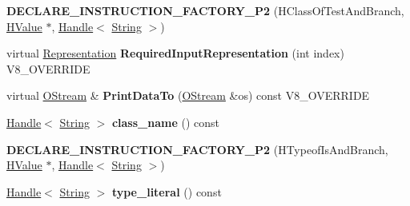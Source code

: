 \begin{DoxyCompactItemize}
\item 
\hypertarget{classv8_1_1internal_1_1_v8___f_i_n_a_l_a90813e22afb8a3de733c7b9fedb4fa93}{}{\bfseries D\+E\+C\+L\+A\+R\+E\+\_\+\+I\+N\+S\+T\+R\+U\+C\+T\+I\+O\+N\+\_\+\+F\+A\+C\+T\+O\+R\+Y\+\_\+\+P2} (H\+Class\+Of\+Test\+And\+Branch, \hyperlink{classv8_1_1internal_1_1_h_value}{H\+Value} $\ast$, \hyperlink{classv8_1_1internal_1_1_handle}{Handle}$<$ \hyperlink{classv8_1_1internal_1_1_string}{String} $>$)\label{classv8_1_1internal_1_1_v8___f_i_n_a_l_a90813e22afb8a3de733c7b9fedb4fa93}

\item 
\hypertarget{classv8_1_1internal_1_1_v8___f_i_n_a_l_a6c6d1f37f40b113d8f4062f1ffff7215}{}virtual \hyperlink{classv8_1_1internal_1_1_representation}{Representation} {\bfseries Required\+Input\+Representation} (int index) V8\+\_\+\+O\+V\+E\+R\+R\+I\+D\+E\label{classv8_1_1internal_1_1_v8___f_i_n_a_l_a6c6d1f37f40b113d8f4062f1ffff7215}

\item 
\hypertarget{classv8_1_1internal_1_1_v8___f_i_n_a_l_ac450dad970b14246be761ccf5004924b}{}virtual \hyperlink{classv8_1_1internal_1_1_o_stream}{O\+Stream} \& {\bfseries Print\+Data\+To} (\hyperlink{classv8_1_1internal_1_1_o_stream}{O\+Stream} \&os) const V8\+\_\+\+O\+V\+E\+R\+R\+I\+D\+E\label{classv8_1_1internal_1_1_v8___f_i_n_a_l_ac450dad970b14246be761ccf5004924b}

\item 
\hypertarget{classv8_1_1internal_1_1_v8___f_i_n_a_l_a7b18ffc26a6e41abdb1d829e56fcd61e}{}\hyperlink{classv8_1_1internal_1_1_handle}{Handle}$<$ \hyperlink{classv8_1_1internal_1_1_string}{String} $>$ {\bfseries class\+\_\+name} () const \label{classv8_1_1internal_1_1_v8___f_i_n_a_l_a7b18ffc26a6e41abdb1d829e56fcd61e}

\item 
\hypertarget{classv8_1_1internal_1_1_v8___f_i_n_a_l_a01be5f0601a2911dc3a01f5fe46094ad}{}{\bfseries D\+E\+C\+L\+A\+R\+E\+\_\+\+I\+N\+S\+T\+R\+U\+C\+T\+I\+O\+N\+\_\+\+F\+A\+C\+T\+O\+R\+Y\+\_\+\+P2} (H\+Typeof\+Is\+And\+Branch, \hyperlink{classv8_1_1internal_1_1_h_value}{H\+Value} $\ast$, \hyperlink{classv8_1_1internal_1_1_handle}{Handle}$<$ \hyperlink{classv8_1_1internal_1_1_string}{String} $>$)\label{classv8_1_1internal_1_1_v8___f_i_n_a_l_a01be5f0601a2911dc3a01f5fe46094ad}

\item 
\hypertarget{classv8_1_1internal_1_1_v8___f_i_n_a_l_a3844dc87488b3457cb2b5a2254e4f804}{}\hyperlink{classv8_1_1internal_1_1_handle}{Handle}$<$ \hyperlink{classv8_1_1internal_1_1_string}{String} $>$ {\bfseries type\+\_\+literal} () const \label{classv8_1_1internal_1_1_v8___f_i_n_a_l_a3844dc87488b3457cb2b5a2254e4f804}


\end{DoxyCompactItemize}
